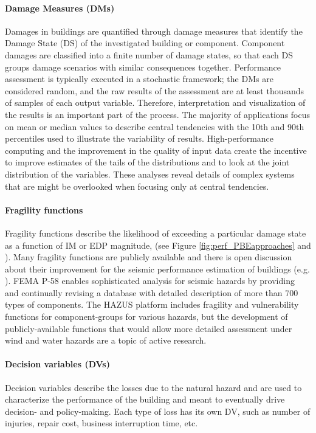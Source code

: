 \paragraph{Damage Measures (DMs)} Damages in buildings are quantified through damage measures that identify the Damage State (DS) of the investigated building or component. Component damages are classified into a finite number of damage states, so that each DS groups damage scenarios with similar consequences together. Performance assessment is typically executed in a stochastic framework; the DMs are considered random, and the raw results of the assessment are at least thousands of samples of each output variable. Therefore, interpretation and visualization of the results is an important part of the process. The majority of applications focus on mean or median values to describe central tendencies with the 10th and 90th percentiles used to illustrate the variability of results. High-performance computing and the improvement in the quality of input data create the incentive to improve estimates of the tails of the distributions and to look at the joint distribution of the variables. These analyses reveal details of complex systems that are might be overlooked when focusing only at central tendencies.

\paragraph{Fragility functions} Fragility functions describe the likelihood of exceeding a particular damage state as a function of IM or EDP magnitude, (see Figure \ref{fig:perf_PBEapproaches} and \citep{baker2021seismic}). Many fragility functions are publicly available and there is open discussion about their improvement for the seismic performance estimation of buildings (e.g. \cite{silva2019current}). FEMA P-58 enables sophisticated analysis for seismic hazards by providing \citep{atc2012p-58} and continually revising \citep{atc2018p-58-1} a database with detailed description of more than 700 types of components. The HAZUS platform includes fragility and vulnerability functions for component-groups for various hazards, but the development of publicly-available functions that would allow more detailed assessment under wind and water hazards are a topic of active research.

\paragraph{Decision variables (DVs)} Decision variables describe the losses due to the natural hazard and are used to characterize the performance of the building and meant to eventually drive decision- and policy-making. Each type of loss has its own DV, such as number of injuries, repair cost, business interruption time, etc.

